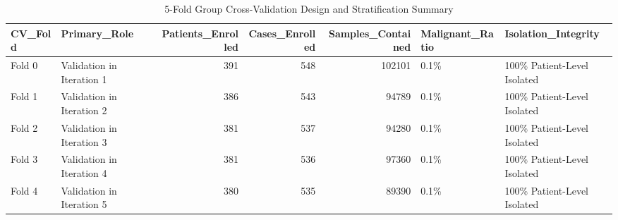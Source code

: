 \begin{table}
\caption{5-Fold Group Cross-Validation Design and Stratification Summary}
\label{tab:table_cross_validation_summary}
\begin{tabular}{llrrrll}
\toprule
CV\_Fold & Primary\_Role & Patients\_Enrolled & Cases\_Enrolled & Samples\_Contained & Malignant\_Ratio & Isolation\_Integrity \\
\midrule
Fold 0 & Validation in Iteration 1 & 391 & 548 & 102101 & 0.1\% & 100\% Patient-Level Isolated \\
Fold 1 & Validation in Iteration 2 & 386 & 543 & 94789 & 0.1\% & 100\% Patient-Level Isolated \\
Fold 2 & Validation in Iteration 3 & 381 & 537 & 94280 & 0.1\% & 100\% Patient-Level Isolated \\
Fold 3 & Validation in Iteration 4 & 381 & 536 & 97360 & 0.1\% & 100\% Patient-Level Isolated \\
Fold 4 & Validation in Iteration 5 & 380 & 535 & 89390 & 0.1\% & 100\% Patient-Level Isolated \\
\bottomrule
\end{tabular}
\end{table}
